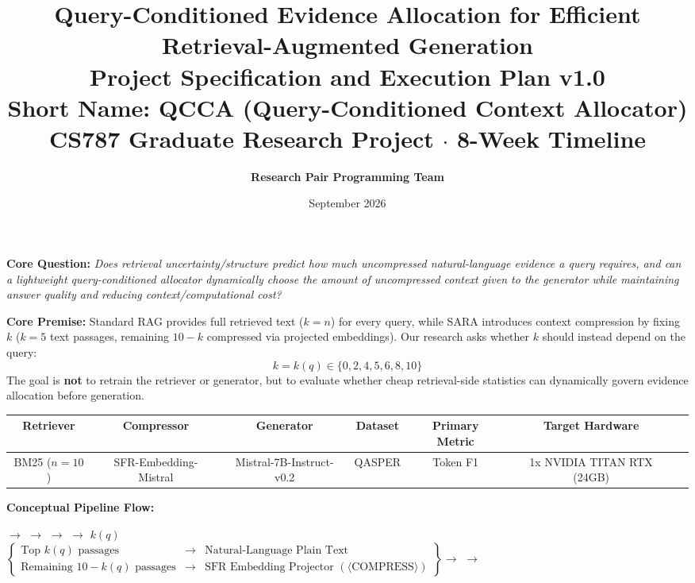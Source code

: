 \documentclass[11pt,a4paper]{article}
\title{
    \vspace{-1.5cm}
    \textbf{\Large Query-Conditioned Evidence Allocation for Efficient Retrieval-Augmented Generation} \\[0.3em]
    \large\textbf{Project Specification and Execution Plan v1.0} \\[0.2em]
    \normalsize\textcolor{tealblue}{\textbf{Short Name: QCCA (Query-Conditioned Context Allocator)}} \\[0.1em]
    \small CS787 Graduate Research Project $\cdot$ 8-Week Timeline
}
\author{\textbf{Research Pair Programming Team}}
\date{September 2026}
\begin{document}
\maketitle
\vspace{-0.5cm}

\begin{summarybox}
\textbf{Core Question:} \textit{Does retrieval uncertainty/structure predict how much uncompressed natural-language evidence a query requires, and can a lightweight query-conditioned allocator dynamically choose the amount of uncompressed context given to the generator while maintaining answer quality and reducing context/computational cost?}
\vspace{0.4em}

\textbf{Core Premise:} Standard RAG provides full retrieved text ($k=n$) for every query, while SARA introduces context compression by fixing $k$ ($k=5$ text passages, remaining $10-k$ compressed via projected embeddings). Our research asks whether $k$ should instead depend on the query:
\begin{equation*}
k = k(q) \in \{0, 2, 4, 5, 6, 8, 10\}
\end{equation*}
The goal is \textbf{not} to retrain the retriever or generator, but to evaluate whether cheap retrieval-side statistics can dynamically govern evidence allocation before generation.
\end{summarybox}

\begin{center}
\small
\begin{tabular}{ccccccc}
\toprule
\textbf{Retriever} & \textbf{Compressor} & \textbf{Generator} & \textbf{Dataset} & \textbf{Primary Metric} & \textbf{Target Hardware} \\
\midrule
BM25 ($n=10$) & SFR-Embedding-Mistral & Mistral-7B-Instruct-v0.2 & QASPER & Token F1 & 1x NVIDIA TITAN RTX (24GB) \\
\bottomrule
\end{tabular}
\end{center}

\vspace{0.2cm}
\noindent\textbf{Conceptual Pipeline Flow:}
\begin{center}
\small
\setlength{\fboxsep}{6pt}
 $\longrightarrow$  $\longrightarrow$  $\longrightarrow$  $\longrightarrow$ \textbf{$k(q)$}
\\[0.5em]
$\left\{
\begin{array}{lcl}
\text{Top } k(q) \text{ passages} & \longrightarrow & \text{Natural-Language Plain Text} \\
\text{Remaining } 10 - k(q) \text{ passages} & \longrightarrow & \text{SFR Embedding Projector } (\langle\text{COMPRESS}\rangle)
\end{array}
\right\} \longrightarrow$  $\longrightarrow$ 
\end{center}
\end{document}
